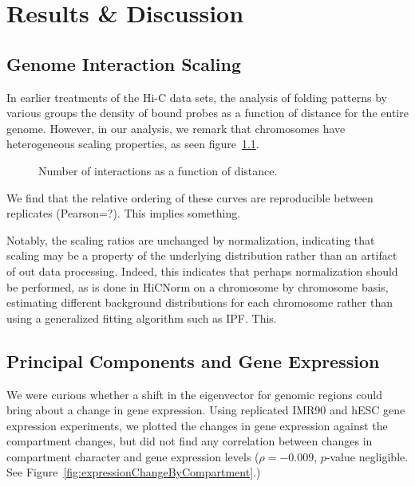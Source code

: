 \chapter{Results \& Discussion}

\section*{Genome Interaction Scaling}
In earlier treatments of the Hi-C data sets, the analysis of folding patterns by various groups \citep{imakaev2012} \citep{dixon2012}
the density of bound probes as a function of distance for the entire genome.  However, in our analysis, we remark that chromosomes
have heterogeneous scaling properties, as seen figure~\ref{fig:interactionScaling}.

\begin{figure}[h]
  \caption{Number of interactions as a function of distance.}\label{fig:interactionScaling}
\end{figure}

We find that the relative ordering of these curves are reproducible between replicates (Pearson=?).  This implies something.

Notably, the scaling ratios are unchanged by normalization, indicating that scaling may be a property of the underlying distribution
rather than an artifact of out data processing.  Indeed, this indicates that perhaps normalization should be performed, as is
done in HiCNorm \citep{hu2012} on a chromosome by chromosome basis, estimating different background distributions for each chromosome
rather than using a generalized fitting algorithm such as IPF\@.  This.

\section*{Principal Components and Gene Expression}

We were curious whether a shift in the eigenvector for genomic regions could bring about a change in gene expression.  Using replicated
IMR90 and hESC gene expression experiments, we plotted the changes in gene expression against the compartment changes, but did not
find any correlation between changes in compartment character and gene expression levels ($\rho = -0.009$, $p$-value negligible.
See Figure~\ref{fig:expressionChangeByCompartment}.)

